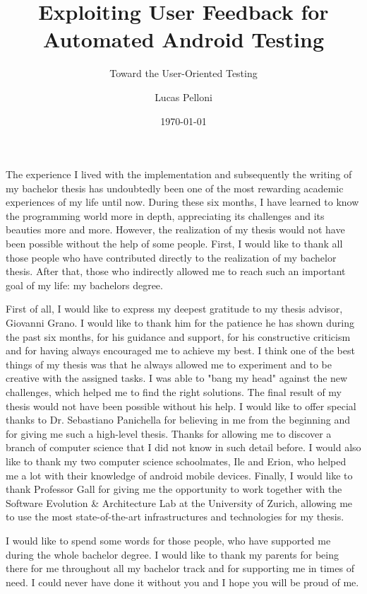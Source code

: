 \documentclass{seal_thesis}
\date{\today}
\title{Exploiting User Feedback \vspace{0.25em} for Automated  Android Testing}
\subtitle{Toward the User-Oriented Testing}
\author{Lucas Pelloni}
\begin{document}
\maketitle



\frontmatter




\begin{acknowledgements}
The experience I lived with the implementation and subsequently the writing of my bachelor thesis has undoubtedly been one of the most rewarding academic experiences of my life until now. During these six months, I have learned to know the programming world more in depth, appreciating its challenges and its beauties more and more. However, the realization of my thesis would not have been possible without the help of some people. First, I would like to thank all those people who have contributed directly to the realization of my bachelor thesis. After that, those who indirectly allowed me to reach such an important goal of my life: my bachelors degree. 

First of all, I would like to express my deepest gratitude to my thesis advisor, Giovanni Grano. I would like to thank him for the patience he has shown during the past six months, for his guidance and support, for his constructive criticism and for having always encouraged me to achieve my best. I think one of the best things of my thesis was that he always allowed me to experiment and to be creative with the assigned tasks. I was able to "bang my head" against the new challenges, which helped me to find the right solutions. The final result of my thesis would not have been possible without his help. I would like to offer special thanks to Dr. Sebastiano Panichella for believing in me from the beginning and for giving me such a high-level thesis. Thanks for allowing me to discover a branch of computer science that I did not know in such detail before. I would also like to thank my two computer science schoolmates, Ile and Erion, who helped me a lot with their knowledge of android mobile devices. Finally, I would like to thank Professor Gall for giving me the opportunity to work together with the Software Evolution \& Architecture Lab at the University of Zurich, allowing me to use the most state-of-the-art infrastructures and technologies for my thesis. 

I would like to spend some words for those people, who have supported me during the whole bachelor degree. I would like to thank my parents for being there for me throughout all my bachelor track and for supporting me in times of need. I could never have done it without you and I hope you will be proud of me. 
\end{acknowledgements}
\end{document}
